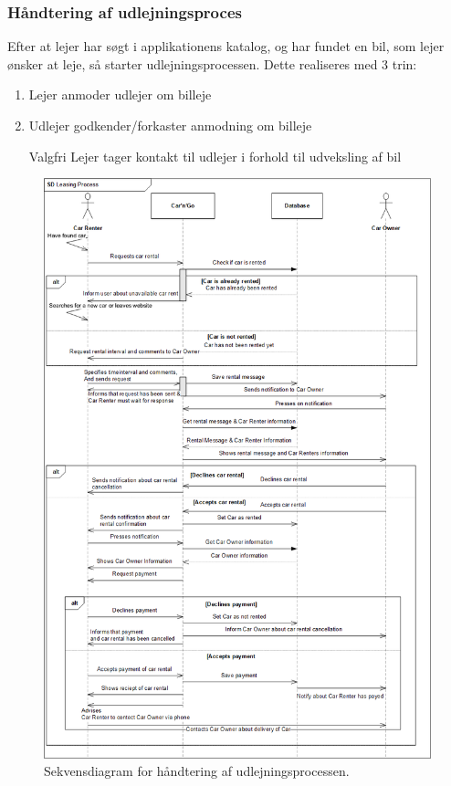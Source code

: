 \documentclass[Rapport/Rapport_main.tex]{subfiles}
\begin{document}
\subsubsection{Håndtering af udlejningsproces}
Efter at lejer har søgt i applikationens katalog, og har fundet en bil, som lejer ønsker at leje, så starter udlejningsprocessen. Dette realiseres med 3 trin: 
\begin{enumerate}
    \item Lejer anmoder udlejer om billeje 
    \item Udlejer godkender/forkaster anmodning om billeje 
    \item [Valgfri] Lejer tager kontakt til udlejer i forhold til udveksling af bil
\end{enumerate}
\begin{figure}[H]
    \centering
    \includegraphics[width=1.1\textwidth]{Arkitektur/Softwarearkitektur/Leasing/graphics/Leasing_processSD.png}
    \caption{Sekvensdiagram for håndtering af udlejningsprocessen.}
    \label{fig:Leasing_processCD}
\end{figure}
\end{document}
